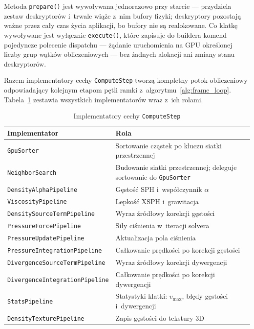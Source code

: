 Metoda \texttt{prepare()} jest wywoływana jednorazowo przy starcie ---
przydziela zestaw deskryptorów i~trwale wiąże z~nim bufory fizyki;
deskryptory pozostają ważne przez cały czas życia aplikacji, bo bufory
nie są realokowane.
Co klatkę wywoływane jest wyłącznie \texttt{execute()}, które zapisuje
do buildera komend pojedyncze polecenie dispatchu --- żądanie uruchomienia
na GPU określonej liczby grup wątków obliczeniowych --- bez żadnych
alokacji ani zmiany stanu deskryptorów.

Razem implementatory cechy \texttt{ComputeStep} tworzą kompletny potok
obliczeniowy odpowiadający kolejnym etapom pętli ramki
z~algorytmu~\ref{alg:frame_loop}.
Tabela~\ref{tab:compute_steps} zestawia wszystkich implementatorów
wraz z~ich rolami.

\begin{table}[htbp]
\centering
\caption{Implementatory cechy \texttt{ComputeStep}}
\label{tab:compute_steps}
\begin{tabular}{p{6.5cm}p{7cm}}
\toprule
\textbf{Implementator} & \textbf{Rola} \\
\midrule
\texttt{GpuSorter}                     & Sortowanie cząstek po kluczu siatki przestrzennej \\[3pt]
\texttt{NeighborSearch}                & Budowanie siatki przestrzennej; deleguje sortowanie do \texttt{GpuSorter} \\[3pt]
\texttt{DensityAlphaPipeline}          & Gęstość SPH i~współczynnik $\alpha$ \\[3pt]
\texttt{ViscosityPipeline}             & Lepkość XSPH i~grawitacja \\[3pt]
\texttt{DensitySourceTermPipeline}     & Wyraz źródłowy korekcji gęstości \\[3pt]
\texttt{PressureForcePipeline}         & Siły ciśnienia w~iteracji solvera \\[3pt]
\texttt{PressureUpdatePipeline}        & Aktualizacja pola ciśnienia \\[3pt]
\texttt{PressureIntegrationPipeline}   & Całkowanie prędkości po korekcji gęstości \\[3pt]
\texttt{DivergenceSourceTermPipeline}  & Wyraz źródłowy korekcji dywergencji \\[3pt]
\texttt{DivergenceIntegrationPipeline} & Całkowanie prędkości po korekcji dywergencji \\[3pt]
\texttt{StatsPipeline}                 & Statystyki klatki: $v_{\max}$, błędy gęstości i~dywergencji \\[3pt]
\texttt{DensityTexturePipeline}        & Zapis gęstości do tekstury 3D  \\
\bottomrule
\end{tabular}
\end{table}

